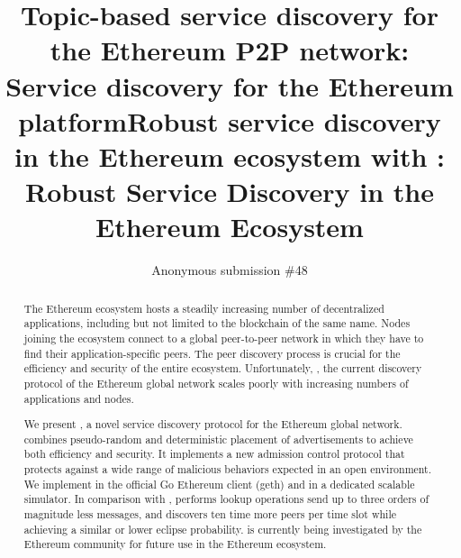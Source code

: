 \documentclass[compsoc, conference, a4paper, 10pt, times]{IEEEtran}
\begin{document}
\title{Topic-based service discovery for the Ethereum P2P network}
\title{\sysname: Service discovery for the Ethereum platform}
\title{Robust service discovery in the Ethereum ecosystem with \sysname}
\title{\sysname: Robust Service Discovery in the Ethereum Ecosystem}
\author{Anonymous submission \#48}
\maketitle
\begin{abstract}

The Ethereum ecosystem hosts a steadily increasing number of decentralized applications, including but not limited to the blockchain of the same name. Nodes joining the ecosystem connect to a global peer-to-peer network in which they have to find their application-specific peers. The peer discovery process is crucial for the efficiency and security of the entire ecosystem. Unfortunately, \discv, the current discovery protocol of the Ethereum global network scales poorly with increasing numbers of applications and nodes.

We present \sysname, a novel service discovery protocol for the Ethereum global network. \sysname combines pseudo-random and deterministic placement of advertisements to achieve both efficiency and security. It implements a new admission control protocol that protects against a wide range of malicious behaviors expected in an open environment. 
We implement \sysname in the official Go Ethereum client (geth) and in a dedicated scalable simulator.
In comparison with \discv, \sysname performs lookup operations send up to three orders of magnitude less messages, and discovers ten time more peers per time slot while achieving a similar or lower eclipse probability. 
\sysname is currently being investigated by the Ethereum community for future use in the Ethereum ecosystem.

\end{abstract}





















%
\clearpage



\end{document}
